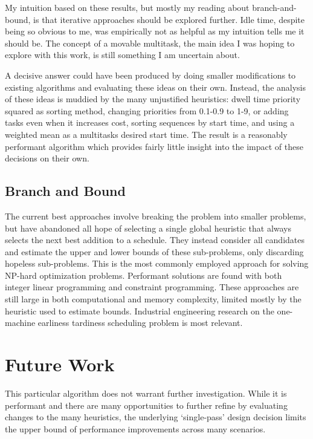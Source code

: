 \documentclass[journal,12pt,onecolumn,draftclsnofoot,]{IEEEtran}
\begin{document}
My intuition based on these results, but mostly my reading about branch-and-bound, is that iterative approaches should be explored further.
Idle time, despite being so obvious to me, was empirically not as helpful as my intuition tells me it should be.
The concept of a movable multitask, the main idea I was hoping to explore with this work, is still something I am uncertain about.

A decisive answer could have been produced by doing smaller modifications to existing algorithms and evaluating these ideas on their own.
Instead, the analysis of these ideas is muddied by the many unjustified heuristics: dwell time priority squared as sorting method, changing priorities from 0.1-0.9 to 1-9, or adding tasks even when it increases cost, sorting sequences by start time, and using a weighted mean as a multitasks desired start time.
The result is a reasonably performant algorithm which provides fairly little insight into the impact of these decisions on their own.

\subsection{Branch and Bound}

The current best approaches involve breaking the problem into smaller problems, but have abandoned all hope of selecting a single global heuristic that always selects the next best addition to a schedule.
They instead consider all candidates and estimate the upper and lower bounds of these sub-problems, only discarding hopeless sub-problems.
This is the most commonly employed approach for solving NP-hard optimization problems.
Performant solutions are found with both integer linear programming and constraint programming.
These approaches are still large in both computational and memory complexity, limited mostly by the heuristic used to estimate bounds.
Industrial engineering research on the one-machine earliness tardiness scheduling problem is most relevant.

\section{Future Work}

This particular algorithm does not warrant further investigation.
While it is performant and there are many opportunities to further refine by evaluating changes to the many heuristics,
the underlying `single-pass' design decision limits the upper bound of performance improvements across many scenarios.
\end{document}
